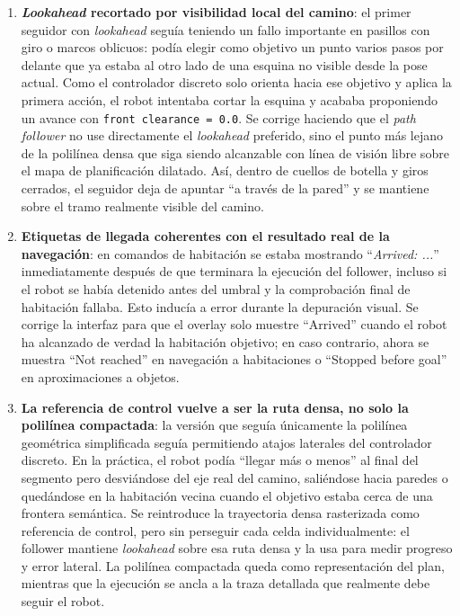 \begin{enumerate}
  \item \textbf{\textit{Lookahead} recortado por visibilidad local del camino}:
        el primer seguidor con \textit{lookahead} seguía teniendo un fallo
        importante en pasillos con giro o marcos oblicuos: podía elegir como
        objetivo un punto varios pasos por delante que ya estaba al otro lado
        de una esquina no visible desde la pose actual. Como el controlador
        discreto solo orienta hacia ese objetivo y aplica la primera acción,
        el robot intentaba cortar la esquina y acababa proponiendo un avance
        con \texttt{front clearance = 0.0}. Se corrige haciendo que el
        \textit{path follower} no use directamente el \textit{lookahead}
        preferido, sino el punto más lejano de la polilínea densa que siga
        siendo alcanzable con línea de visión libre sobre el mapa de
        planificación dilatado. Así, dentro de cuellos de botella y giros
        cerrados, el seguidor deja de apuntar ``a través de la pared'' y se
        mantiene sobre el tramo realmente visible del camino.

  \item \textbf{Etiquetas de llegada coherentes con el resultado real de la
        navegación}: en comandos de habitación se estaba mostrando
        ``\textit{Arrived: ...}'' inmediatamente después de que terminara la
        ejecución del follower, incluso si el robot se había detenido antes del
        umbral y la comprobación final de habitación fallaba. Esto inducía a
        error durante la depuración visual. Se corrige la interfaz para que el
        overlay solo muestre ``Arrived'' cuando el robot ha alcanzado de verdad
        la habitación objetivo; en caso contrario, ahora se muestra
        ``Not reached'' en navegación a habitaciones o ``Stopped before goal''
        en aproximaciones a objetos.

  \item \textbf{La referencia de control vuelve a ser la ruta densa, no solo
        la polilínea compactada}: la versión que seguía únicamente la
        polilínea geométrica simplificada seguía permitiendo atajos laterales
        del controlador discreto. En la práctica, el robot podía ``llegar más
        o menos'' al final del segmento pero desviándose del eje real del
        camino, saliéndose hacia paredes o quedándose en la habitación vecina
        cuando el objetivo estaba cerca de una frontera semántica. Se
        reintroduce la trayectoria densa rasterizada como referencia de
        control, pero sin perseguir cada celda individualmente: el follower
        mantiene \textit{lookahead} sobre esa ruta densa y la usa para medir
        progreso y error lateral. La polilínea compactada queda como
        representación del plan, mientras que la ejecución se ancla a la traza
        detallada que realmente debe seguir el robot.


\end{enumerate}
